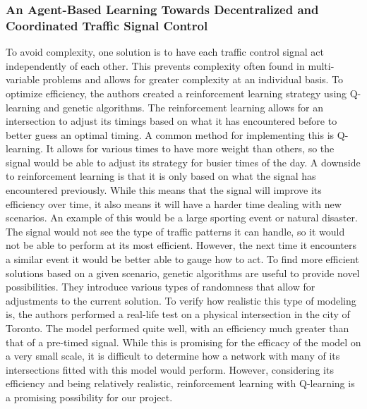 \documentclass[onecolumn, draftclsnofoot,10pt, compsoc]{IEEEtran}
\begin{document}
\subsubsection{An Agent-Based Learning Towards Decentralized and Coordinated Traffic Signal Control \cite{el2010agent}}
To avoid complexity, one solution is to have each traffic control signal act independently of each other.
This prevents complexity often found in multi-variable problems and allows for greater complexity at an individual basis.
To optimize efficiency, the authors created a reinforcement learning strategy using Q-learning and genetic algorithms.
The reinforcement learning allows for an intersection to adjust its timings based on what it has encountered before to better guess an optimal timing.
A common method for implementing this is Q-learning.
It allows for various times to have more weight than others, so the signal would be able to adjust its strategy for busier times of the day.
A downside to reinforcement learning is that it is only based on what the signal has encountered previously.
While this means that the signal will improve its efficiency over time, it also means it will have a harder time dealing with new scenarios.
An example of this would be a large sporting event or natural disaster.
The signal would not see the type of traffic patterns it can handle, so it would not be able to perform at its most efficient.
However, the next time it encounters a similar event it would be better able to gauge how to act.
To find more efficient solutions based on a given scenario, genetic algorithms are useful to provide novel possibilities.
They introduce various types of randomness that allow for adjustments to the current solution.
To verify how realistic this type of modeling is, the authors performed a real-life test on a physical intersection in the city of Toronto.
The model performed quite well, with an efficiency much greater than that of a pre-timed signal.
While this is promising for the efficacy of the model on a very small scale, it is difficult to determine how a network with many of its intersections fitted with this model would perform.
However, considering its efficiency and being relatively realistic, reinforcement learning with Q-learning is a promising possibility for our project.
\end{document}
